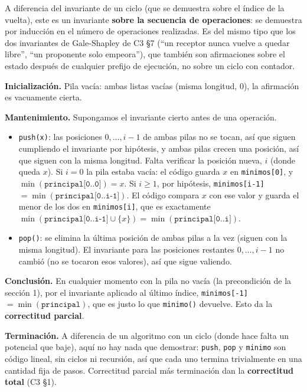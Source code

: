 \documentclass[11pt]{article}
\begin{document}
A diferencia del invariante de un ciclo (que se demuestra sobre el índice de la vuelta), este es un
invariante \textbf{sobre la secuencia de operaciones}: se demuestra por inducción en el número de
operaciones realizadas. Es del mismo tipo que los dos invariantes de Gale-Shapley de C3 §7 (``un receptor
nunca vuelve a quedar libre'', ``un proponente solo empeora''), que también son afirmaciones sobre el
estado después de cualquier prefijo de ejecución, no sobre un ciclo con contador.

\textbf{Inicialización.} Pila vacía: ambas listas vacías (misma longitud, 0), la afirmación es vacuamente
cierta.

\textbf{Mantenimiento.} Supongamos el invariante cierto antes de una operación.
\begin{itemize}
\item \texttt{push(x)}: las posiciones $0,\dots,i{-}1$ de ambas pilas no se tocan, así que siguen cumpliendo
el invariante por hipótesis, y ambas pilas crecen una posición, así que siguen con la misma longitud.
Falta verificar la posición nueva, $i$ (donde queda $x$). Si $i=0$ la pila estaba vacía: el código guarda $x$ en
\texttt{minimos[0]}, y $\min(\texttt{principal[0..0]})=x$. Si $i\ge 1$, por hipótesis,
\texttt{minimos[i-1]} $=\min(\texttt{principal[0..i-1]})$. El código compara $x$ con ese valor y guarda el
menor de los dos en \texttt{minimos[i]}, que es exactamente
$\min(\texttt{principal[0..i-1]}\cup\{x\}) = \min(\texttt{principal[0..i]})$.
\item \texttt{pop()}: se elimina la última posición de ambas pilas a la vez (siguen con la misma longitud). El
invariante para las posiciones restantes $0,\dots,i{-}1$ no cambió (no se tocaron esos valores), así que sigue valiendo.
\end{itemize}

\textbf{Conclusión.} En cualquier momento con la pila no vacía (la precondición de la sección 1),
por el invariante aplicado al último índice, \texttt{minimos[-1]} $=\min(\texttt{principal})$, que es
justo lo que \texttt{minimo()} devuelve. Esto da la \textbf{correctitud parcial}.

\textbf{Terminación.} A diferencia de un algoritmo con un ciclo (donde hace falta un potencial que baje),
aquí no hay nada que demostrar: \texttt{push}, \texttt{pop} y \texttt{minimo} son código lineal, sin
ciclos ni recursión, así que cada uno termina trivialmente en una cantidad fija de pasos. Correctitud
parcial más terminación dan la \textbf{correctitud total} (C3 §1).
\end{document}
